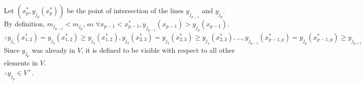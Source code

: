 \documentclass{article}
\begin{document}

Let $(x^*_p, y_{j_p}(x^*_p))$ be the point of intersection of the lines $y_{j_{p-1}}$ and $y_{j_{p}}$.\\
By definition, $m_{j_{p-1}} < m_{j_{p}}$, so $\forall x_{p-1} < x^*_{p-1}, y_{j_{p-1}} (x_{p-1}) > y_{j_{p}} (x_{p-1})$.\\
$\therefore y_{j_{1}}(x^*_{1,2}) = y_{j_{2}}(x^*_{1,2}) \geq y_{j_3}(x^*_{1,2}), y_{j_{2}}(x^*_{2,3}) = y_{j_{3}}(x^*_{2,3}) \geq y_{j_4}(x^*_{2,3}), ..., y_{j_{p-1}}(x^*_{p-1,p}) = y_{j_{p}}(x^*_{p-1,p}) \geq y_{j_{p+1}}(x^*_{p-1,p}), ..., y_{j_{k-1}}(x^*_{k-1,k}) = y_{j_{k}}(x^*_{k-1,k}) \geq y_{j_{i}}(x^*_{k-1,k})$\\
Since $y_{j_p}$ was already in $V$, it is defined to be visible with respect to all other elements in $V$.\\
$\therefore y_{j_p} \in V^+$.
\end{document}
